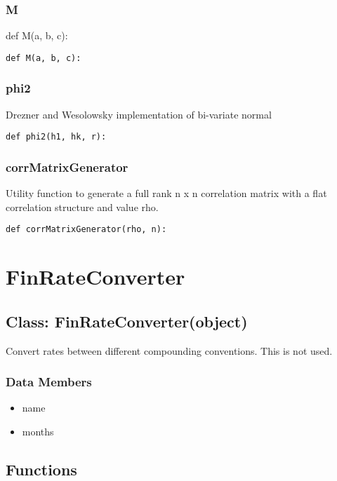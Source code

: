 \documentclass[twoside,11pt]{book}
\begin{document}
\subsubsection*{{\bf M}}
def M(a, b, c): 

\begin{lstlisting}
def M(a, b, c):
\end{lstlisting}

\subsubsection*{{\bf phi2}}
Drezner and Wesolowsky implementation of bi-variate normal  

\begin{lstlisting}
def phi2(h1, hk, r):
\end{lstlisting}

\subsubsection*{{\bf corrMatrixGenerator}}
Utility function to generate a full rank n x n correlation matrix with a flat correlation structure and value rho.  

\begin{lstlisting}
def corrMatrixGenerator(rho, n):
\end{lstlisting}

\newpage
\section{FinRateConverter}

\subsection*{Class: FinRateConverter(object)}
Convert rates between different compounding conventions. This is not used.  

\subsubsection*{Data Members}
\begin{itemize}
\item{name}
\item{months}
\end{itemize}

\subsection*{Functions}
\end{document}
